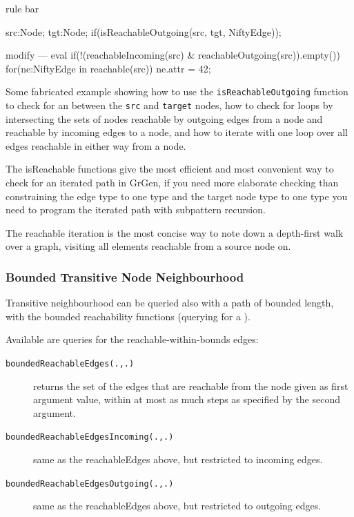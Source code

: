 \begin{example}
\begin{grgen}
rule bar {
    src:Node; 
    tgt:Node;
    if(isReachableOutgoing(src, tgt, NiftyEdge));
    
    modify {
    ---
        eval {
            if(!(reachableIncoming(src) & reachableOutgoing(src)).empty())
            {
                for(ne:NiftyEdge in reachable(src))
                {
                    ne.attr = 42;
                }
            }
        }
    }
}
\end{grgen}
Some fabricated example showing how to use the \texttt{isReachableOutgoing} function to check for an  between the \texttt{src} and \texttt{target} nodes, how to check for loops by intersecting the sets of nodes reachable by outgoing edges from a node and reachable by incoming edges to a node, and how to iterate with one loop over all edges reachable in either way from a node.

The isReachable functions give the most efficient and most convenient way to check for an iterated path in GrGen, if you need more elaborate checking than constraining the edge type to one type and the target node type to one type you need to program the iterated path with subpattern recursion.

The reachable iteration is the most concise way to note down a depth-first walk over a graph, visiting all elements reachable from a source node on.
\end{example}

\subsubsection*{Bounded Transitive Node Neighbourhood}\label{transitiveneighbourbounded}

Transitive neighbourhood can be queried also with a path of bounded length, with the bounded reachability functions (querying for a ).

Available are queries for the reachable-within-bounds edges:

\begin{description}
\item[\texttt{boundedReachableEdges(.,.)}] returns the set of the edges that are reachable from the node given as first argument value, within at most as much steps as specified by the second argument.
\item[\texttt{boundedReachableEdgesIncoming(.,.)}] same as the reachableEdges above, but restricted to incoming edges.
\item[\texttt{boundedReachableEdgesOutgoing(.,.)}] same as the reachableEdges above, but restricted to outgoing edges.
\end{description}

